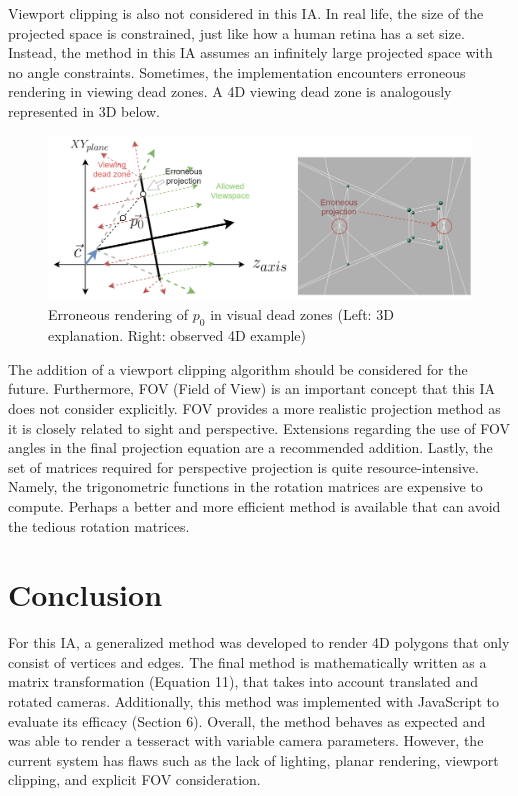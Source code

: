 \documentclass[12pt, letterpaper]{article}
\begin{document}
Viewport clipping is also not considered in this IA. In real life, the size of the projected space is constrained, just like how a human retina has a set size. Instead, the method in this IA assumes an infinitely large projected space with no angle constraints. Sometimes, the implementation encounters erroneous rendering in viewing dead zones. A 4D viewing dead zone is analogously represented in 3D below. 
\begin{figure}[H]
\centering
\includegraphics[width=15cm]{deadzone.png}
\caption{Erroneous rendering of $p_0$ in visual dead zones (Left: 3D explanation. Right: observed 4D example)}
\label{fig:figure}
\end{figure}
The addition of a viewport clipping algorithm should be considered for the future. Furthermore, FOV (Field of View) is an important concept that this IA does not consider explicitly. FOV provides a more realistic projection method as it is closely related to sight and perspective. Extensions regarding the use of FOV angles in the final projection equation are a recommended addition. Lastly, the set of matrices required for perspective projection is quite resource-intensive. Namely, the trigonometric functions in the rotation matrices are expensive to compute. Perhaps a better and more efficient method is available that can avoid the tedious rotation matrices.

\section{Conclusion}
 For this IA, a generalized method was developed to render 4D polygons that only consist of vertices and edges. The final method is mathematically written as a matrix transformation (Equation 11), that takes into account translated and rotated cameras. Additionally, this method was implemented with JavaScript to evaluate its efficacy (Section 6). Overall, the method behaves as expected and was able to render a tesseract with variable camera parameters. However, the current system has flaws such as the lack of lighting, planar rendering, viewport clipping, and explicit FOV consideration. 
\end{document}
